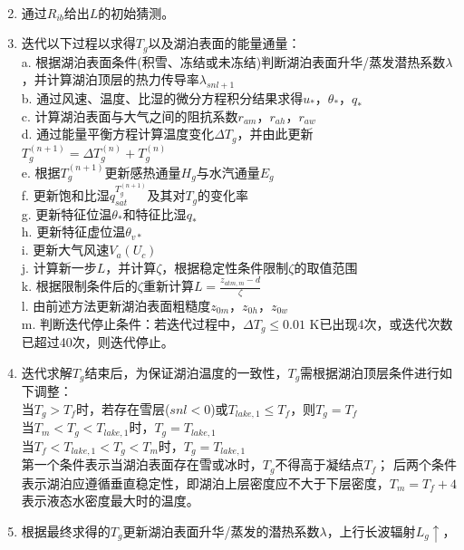 \begin{enumerate}
\begin{equation}
\begin{array}{cl}
            \end{array}
        \end{equation}
    \item 通过$R_{ib}$给出$L$的初始猜测。
    \item 迭代以下过程以求得$T_g$以及湖泊表面的能量通量：\\
    a. 根据湖泊表面条件(积雪、冻结或未冻结)判断湖泊表面升华/蒸发潜热系数$\lambda$，并计算湖泊顶层的热力传导率$\lambda_{snl+1}$ \\
    b. 通过风速、温度、比湿的微分方程积分结果求得$u_\ast$，$\theta_\ast$，$q_\ast$ \\
    c. 计算湖泊表面与大气之间的阻抗系数$r_{am}$，$r_{ah}$，$r_{aw}$ \\
    d. 通过能量平衡方程计算温度变化$\Delta T_g$，并由此更新$T_g^{\left(n+1\right)}=\Delta T_g^{\left(n\right)}+T_g^{\left(n\right)}$ \\
    e. 根据$T_g^{\left(n+1\right)}$更新感热通量$H_g$与水汽通量$E_g$ \\
    f. 更新饱和比湿$q_{sat}^{T_g^{\left(n+1\right)}}$及其对$T_g$的变化率 \\
    g. 更新特征位温$\theta_\ast$和特征比湿$q_\ast$ \\
    h. 更新特征虚位温$\theta_{v\ast}$ \\
    i. 更新大气风速$V_a\left(U_c\right)$ \\
    j. 计算新一步$L$，并计算$\zeta$，根据稳定性条件限制$\zeta$的取值范围 \\
    k. 根据限制条件后的$\zeta$重新计算$L=\frac{z_{atm,m}-d}{\zeta}$ \\
    l. 由前述方法更新湖泊表面粗糙度$z_{0m}$，$z_{0h}$，$z_{0w}$\\
    m. 判断迭代停止条件：若迭代过程中，$\Delta T_g\leq 0.01$ K已出现4次，或迭代次数已超过40次，则迭代停止。
    \item 迭代求解$T_g$结束后，为保证湖泊温度的一致性，$T_g$需根据湖泊顶层条件进行如下调整：\\
    当$T_g>T_f$时，若存在雪层($snl<0$)或$T_{lake,1}\le T_f$，则$T_g=T_f$ \\
    当$T_m<T_g<T_{lake,1}$时，$T_g=T_{lake,1}$ \\
    当$T_f<T_{lake,1}<T_g<T_m$时，$T_g=T_{lake,1}$ \\
    第一个条件表示当湖泊表面存在雪或冰时，$T_g$不得高于凝结点$T_f$；
    后两个条件表示湖泊应遵循垂直稳定性，即湖泊上层密度应不大于下层密度，$T_m=T_f+4$表示液态水密度最大时的温度。
    \item 根据最终求得的$T_g$更新湖泊表面升华/蒸发的潜热系数$\lambda$，上行长波辐射$L_g\uparrow$，

\end{enumerate}
